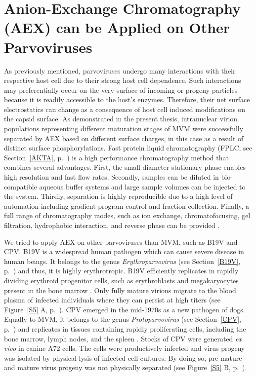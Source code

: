 \section{Anion-Exchange Chromatography (AEX) can be Applied on Other Parvoviruses}

As previously mentioned, parvoviruses undergo many interactions with their respective host cell due to their strong host cell dependence. Such interactions may preferentially occur on the very surface of incoming or progeny particles because it is readily accessible to the host's enzymes. Therefore, their net surface electrostatics can change as a consequence of host cell induced modifications on the capsid surface. As demonstrated in the present thesis, intranuclear virion populations representing different maturation stages of MVM were successfully separated by AEX based on different surface charges, in this case as a result of distinct surface phosphorylations. Fast protein liquid chromatography (FPLC, see Section~\ref{ÄKTA}, p.~\pageref{ÄKTA}) is a high performance chromatography method that combines several advantages. First, the small-diameter stationary phase enables high resolution and fast flow rates. Secondly, samples can be diluted in bio-compatible aqueous buffer systems and large sample volumes can be injected to the system. Thirdly, separation is highly reproducible due to a high level of automation including gradient program control and fraction collection. Finally, a full range of chromatography modes, such as ion exchange, chromatofocusing, gel filtration, hydrophobic interaction, and reverse phase can be provided \cite{pmid20978981}. 

We tried to apply AEX on other parvoviruses than MVM, such as B19V and CPV. B19V is a widespread human pathogen which can cause severe disease in human beings. It belongs to the genus \textit{Erythroparvovirus} (see Section~\ref{B19V}, p.~\pageref{B19V}) and thus, it is highly erythrotropic. B19V efficiently replicates in rapidly dividing erythroid progenitor cells, such as erythroblasts and megakaryocytes present in the bone marrow \cite{pmid12097253}. Only fully mature virions migrate to the blood plasma of infected individuals where they can persist at high titers (see Figure~\ref{S5} A, p.~\pageref{S5}). CPV emerged in the mid-1970s as a new pathogen of dogs. Equally to MVM, it belongs to the genus \textit{Protoparvovirus} (see Section~\ref{CPV}, p.~\pageref{CPV}) and replicates in tissues containing rapidly proliferating cells, including the bone marrow, lymph nodes, and the spleen \cite{pmid20152105}. Stocks of CPV were generated \textit{ex vivo} in canine A72 cells. The cells were productively infected and virus progeny was isolated by physical lysis of infected cell cultures. By doing so, pre-mature and mature virus progeny was not physically separated (see Figure~\ref{S5} B, p.~\pageref{S5}). 

